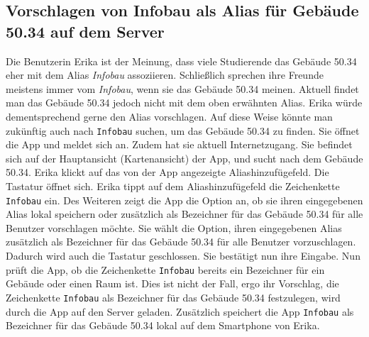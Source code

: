 \subsection{Vorschlagen von Infobau als Alias für Gebäude 50.34 auf dem Server}

Die Benutzerin Erika ist der Meinung, dass viele Studierende das Gebäude 50.34 eher mit dem Alias \textit{Infobau} assoziieren.
Schließlich sprechen ihre Freunde meistens immer vom \textit{Infobau}, wenn sie das Gebäude 50.34 meinen.
Aktuell findet man das Gebäude 50.34 jedoch nicht mit dem oben erwähnten Alias.
Erika würde dementsprechend gerne den Alias vorschlagen.
Auf diese Weise könnte man zukünftig auch nach \texttt{Infobau} suchen, um das Gebäude 50.34 zu finden.
Sie öffnet die App und meldet sich an.
Zudem hat sie aktuell Internetzugang.
Sie befindet sich auf der Hauptansicht (Kartenansicht) der App, und sucht nach dem Gebäude 50.34.
Erika klickt auf das von der App angezeigte Aliashinzufügefeld. 
Die Tastatur öffnet sich.
Erika tippt auf dem Aliashinzufügefeld die Zeichenkette \texttt{Infobau} ein.
Des Weiteren zeigt die App die Option an, ob sie ihren eingegebenen Alias lokal speichern oder zusätzlich als Bezeichner für das Gebäude 50.34 für alle Benutzer vorschlagen möchte.
Sie wählt die Option, ihren eingegebenen Alias zusätzlich als Bezeichner für das Gebäude 50.34 für alle Benutzer vorzuschlagen. 
Dadurch wird auch die Tastatur geschlossen. 
Sie bestätigt nun ihre Eingabe. 
Nun prüft die App, ob die Zeichenkette \texttt{Infobau} bereits ein Bezeichner für ein Gebäude oder einen Raum ist. 
Dies ist nicht der Fall, ergo ihr Vorschlag, die Zeichenkette \texttt{Infobau} als Bezeichner für das Gebäude 50.34 festzulegen, wird durch die App auf den Server geladen. 
Zusätzlich speichert die App \texttt{Infobau} als Bezeichner für das Gebäude 50.34 lokal auf dem Smartphone von Erika.